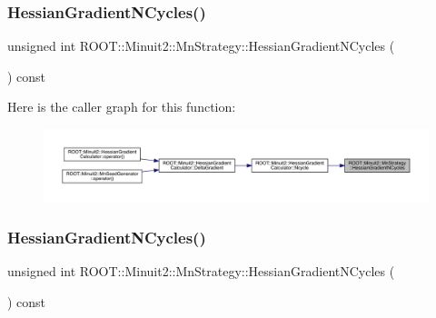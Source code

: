 \subsubsection{\texorpdfstring{HessianGradientNCycles()}{HessianGradientNCycles()}\hspace{0.1cm}{\footnotesize\ttfamily [1/2]}}
{\footnotesize\ttfamily unsigned int R\+O\+O\+T\+::\+Minuit2\+::\+Mn\+Strategy\+::\+Hessian\+Gradient\+N\+Cycles (\begin{DoxyParamCaption}{ }\end{DoxyParamCaption}) const\hspace{0.3cm}{\ttfamily [inline]}}

Here is the caller graph for this function\+:\nopagebreak
\begin{figure}[H]
\begin{center}
\leavevmode
\includegraphics[width=350pt]{da/de4/classROOT_1_1Minuit2_1_1MnStrategy_a49354e374820b73f7e8b6701d7e07922_icgraph}
\end{center}
\end{figure}
\mbox{\label{classROOT_1_1Minuit2_1_1MnStrategy_a49354e374820b73f7e8b6701d7e07922}} 
\subsubsection{\texorpdfstring{HessianGradientNCycles()}{HessianGradientNCycles()}\hspace{0.1cm}{\footnotesize\ttfamily [2/2]}}
{\footnotesize\ttfamily unsigned int R\+O\+O\+T\+::\+Minuit2\+::\+Mn\+Strategy\+::\+Hessian\+Gradient\+N\+Cycles (\begin{DoxyParamCaption}{ }\end{DoxyParamCaption}) const\hspace{0.3cm}{\ttfamily [inline]}}

\mbox{\label{classROOT_1_1Minuit2_1_1MnStrategy_ab2342c7f4896a8ed08c9df93fca93066}} 
